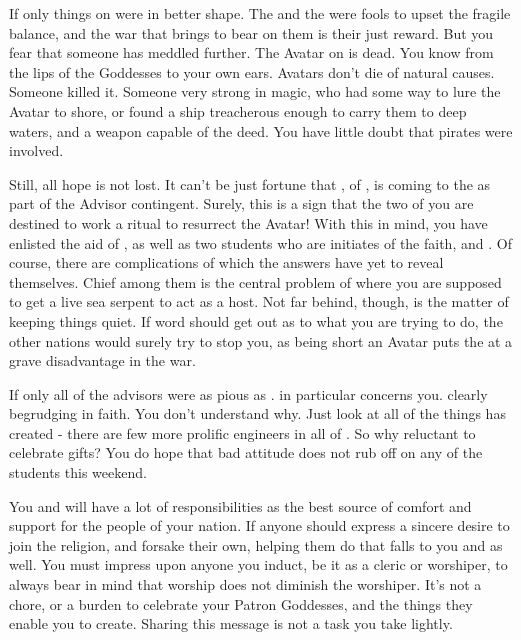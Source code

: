 \documentclass[char]{GL2020}
\begin{document}
If only things on \pEarth{} were in better shape. The \pFarm{} and the \pTech{} were fools to upset the fragile balance, and the war that \cLoud{\full} brings to bear on them is their just reward. But you fear that someone has meddled further. The \cEbb{} Avatar on \pEarth{} is dead. You know from the lips of the Goddesses to your own ears. Avatars don't die of natural causes. Someone killed it. Someone very strong in magic, who had some way to lure the Avatar to shore, or found a ship treacherous enough to carry them to deep waters, and a weapon capable of the deed. You have little doubt that pirates were involved.

Still, all hope is not lost. It can't be just fortune that \cEbbPriest{\full}, \cEbbPriest{\cleric} of \cEbb{}, is coming to the \pSchool{} as part of the \pShip{} Advisor contingent. Surely, this is a sign that the two of you are destined to work a ritual to resurrect the Avatar! With this in mind, you have enlisted the aid of \cEbbPriest{}, as well as two students who are initiates of the faith, \cInitiate{\full} and \cWarlordDaughter{\full}. Of course, there are complications of which the answers have yet to reveal themselves. Chief among them is the central problem of where you are supposed to get a live sea serpent to act as a host. Not far behind, though, is the matter of keeping things quiet. If word should get out as to what you are trying to do, the other nations would surely try to stop you, as being short an Avatar puts the \pShippies{} at a grave disadvantage in the war. 

If only all of the advisors were as pious as \cEbbPriest{}. \cBunker{\full} in particular concerns you. \cBunker{\Theyare} clearly begrudging in \cBunker{\their} faith. You don't understand why. Just look at all of the things \cBunker{} has created - there are few more prolific engineers in all of \pEarth{}. So why \cBunker{\are} \cBunker{\they} reluctant to celebrate \cBunker{\their} gifts?  You do hope that \cBunker{\their} bad attitude does not rub off on any of the students this weekend.

You and \cEbbPriest{} will have a lot of responsibilities as the best source of comfort and support for the people of your nation. If anyone should express a sincere desire to join the \pShip{} religion, and forsake their own, helping them do that falls to you and \cEbbPriest{} as well. You must impress upon anyone you induct, be it as a cleric or worshiper, to always bear in mind that worship does not diminish the worshiper. It's not a chore, or a burden to celebrate your Patron Goddesses, and the things they enable you to create. Sharing this message is not a task you take lightly. 
\end{document}
